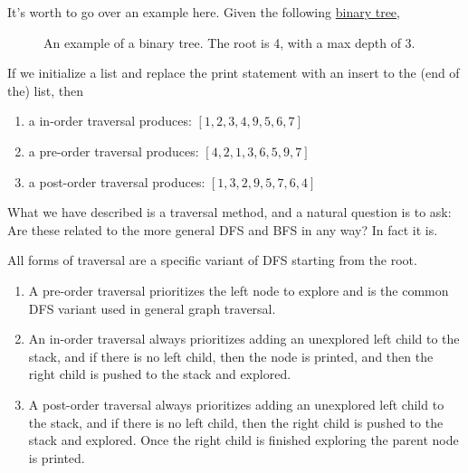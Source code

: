   \begin{example}
    \label{ex:converting-tree-to-list}
    It's worth to go over an example here. Given the following \hyperref[def:binary-tree]{binary tree}, 

    \begin{figure}[H]
      \centering 
      \caption{An example of a binary tree. The root is 4, with a max depth of 3. } 
      \label{fig:binary_tree_to_list}
    \end{figure}
    If we initialize a list and replace the print statement with an insert to the (end of the) list, then 
    \begin{enumerate}
      \item a in-order traversal produces: $[1, 2, 3, 4, 9, 5, 6, 7]$
      \item a pre-order traversal produces: $[4, 2, 1, 3, 6, 5, 9, 7]$
      \item a post-order traversal produces: $[1, 3, 2, 9, 5, 7, 6, 4]$
    \end{enumerate}
  \end{example}

  What we have described is a traversal method, and a natural question is to ask: Are these related to the more general DFS and BFS in any way? In fact it is. 

  \begin{theorem}
    \label{thm:tree_traversal_dfs}
    All forms of traversal are a specific variant of DFS starting from the root. 
    \begin{enumerate}
      \item A pre-order traversal prioritizes the left node to explore and is the common DFS variant used in general graph traversal.  
      \item An in-order traversal always prioritizes adding an unexplored left child to the stack, and if there is no left child, then the node is printed, and then the right child is pushed to the stack and explored. 
      \item A post-order traversal always prioritizes adding an unexplored left child to the stack, and if there is no left child, then the right child is pushed to the stack and explored. Once the right child is finished exploring the parent node is printed. 
    \end{enumerate}
  \end{theorem}

